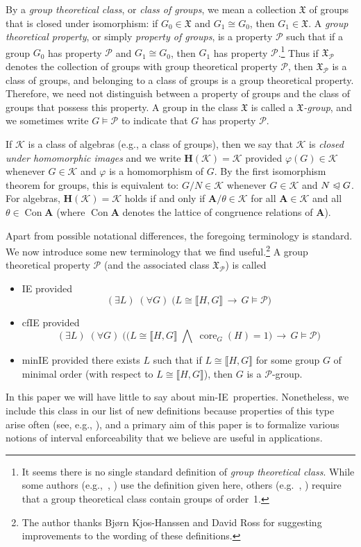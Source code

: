 \documentclass{gen-j-l}
\newcommand{\lb}{\ensuremath{\llbracket}}
\newcommand{\rb}{\ensuremath{\rrbracket}}
\newcommand{\<}{\ensuremath{\langle}}
\renewcommand{\>}{\ensuremath{\rangle}}
\theoremstyle{plain}
\theoremstyle{definition}
\theoremstyle{remark}
\numberwithin{theorem}{section}
\numberwithin{claim}{section}
\numberwithin{equation}{section}
\numberwithin{conjecture}{section}
\newcommand{\defn}[1]{\emph{#1}}
\newcommand{\subnormal}{\ensuremath{\trianglelefteqslant}}
\newcommand{\Meet}{\ensuremath{\bigwedge}}
\newcommand{\Con}{\ensuremath{\operatorname{Con}}}
\newcommand{\core}{\ensuremath{\operatorname{core}}}
\newcommand{\2}{\ensuremath{\mathbf{2}}}
\newcommand{\3}{\ensuremath{\mathbf{3}}}
\newcommand{\bA}{\ensuremath{\mathbf{A}}}
\newcommand{\sG}{\ensuremath{\mathfrak{X}}}
\newcommand{\bH}{\ensuremath{\mathbf{H}}}
\newcommand{\sK}{\ensuremath{\mathscr{K}}}
\newcommand{\cP}{\ensuremath{\mathcal{P}}}
\newcommand{\IE}{{\small IE}}
\renewcommand{\phi}{\ensuremath{\varphi}}
\begin{document}
By a \defn{group theoretical class}, or \defn{class of groups}, we mean a
collection $\sG$ of groups that is closed under isomorphism:
if $G_0\in \sG$ and  $G_1\cong G_0$, then $G_1\in \sG$.
A \defn{group theoretical property}, or simply \defn{property of groups},
is a property $\cP$ such that if a group $G_0$ has property $\cP$ and
$G_1\cong G_0$, then $G_1$ has property $\cP$.\footnote{It seems there
  is no single standard definition of \emph{group theoretical class}.
  While some authors (e.g.,~\cite{Doerk:1992}, \cite{BBE:2006}) use the definition given here,
  others (e.g.~\cite{Robinson:1996}, \cite{Rose:1978}) require that a group
theoretical class contain groups of order~1.}  
Thus if $\sG_{\cP}$ denotes the collection of groups with group theoretical
property $\cP$, then  $\sG_{\cP}$  is a class of groups, and belonging to a
class of groups is a group theoretical property.  Therefore, we need not
distinguish between a property of groups and the class of groups that possess
this property.
A group in the class $\sG$ is called a 
\emph{$\sG$-group}, and 
we sometimes write $G \vDash \cP$ to indicate
that $G$ has property $\cP$. %

If $\sK$ is a class of algebras (e.g., a class of groups), then we say that
$\sK$ is \emph{closed under homomorphic images} and we write $\bH(\sK) = \sK$
provided $\phi(G)\in \sK$ whenever $G\in \sK$ and $\phi$ is a homomorphism of
$G$. By the first isomorphism theorem for
  groups, this is equivalent to: 
$G/N\in \sK$ whenever $G\in \sK$ and $N\subnormal G$.  For algebras, 
$\bH(\sK) = \sK$ holds if and only if $\bA/\theta \in \sK$ for all $\bA\in \sK$
  and all $\theta \in \Con\bA$ (where $\Con\bA$ denotes the lattice of
  congruence relations of $\bA$). 

Apart from possible notational differences, the foregoing terminology is
standard.  We now introduce some new terminology that we find
useful.\footnote{The author thanks Bj{\o}rn Kjos-Hanssen and David Ross for suggesting
  improvements to the wording of these definitions.}
A group theoretical property $\cP$  (and the associated class $\sG_\cP$) is called 
\begin{itemize}
\item 
\ac{IE} provided
\[
(\exists L)  \; (\forall G) \; \bigl(L\cong \lb H,G \rb \, \longrightarrow \, G \vDash \cP\bigr)
\]
\item
\ac{cfIE} provided
\[
(\exists L)  \; (\forall G) \; \bigl(\bigl(L\cong \lb H,G \rb \; \Meet \; \core_G(H)=1\bigr)
\, \longrightarrow \, G  \vDash \cP\bigr)
\]
\item 
\ac{minIE}
provided there exists $L$ such that if $L\cong \lb H,G \rb$ for some group $G$ of
minimal order (with respect to $L\cong \lb H,G \rb$), then
$G$ is a $\cP$-group.   
\end{itemize}
In this paper we will have little to
say about min-\IE\ properties.  Nonetheless, we include this class in our list
of new definitions because properties of this type arise often (see, e.g.,
\cite{Lucchini:1994a}), and a primary aim of this paper is to formalize
various notions of interval enforceability that we believe are
useful in applications. 
\end{document}
